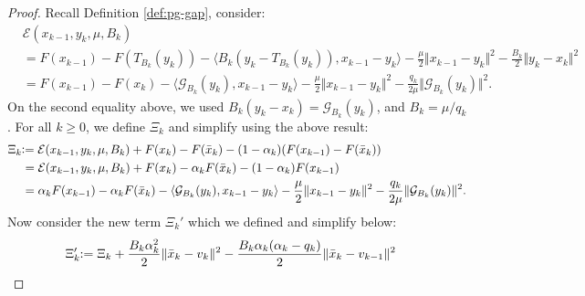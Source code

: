 \documentclass[12pt]{article}
\begin{document}
        \begin{proof}
            Recall Definition \ref{def:pg-gap}, consider: 
            \begin{align*}
                &\mathcal E(x_{k - 1}, y_k, \mu, B_k) 
                \\
                &=
                F(x_{k - 1}) - F(T_{B_k}(y_k))
                - \langle 
                    B_k(y_k - T_{B_k}(y_k)),
                    x_{k - 1} - y_k
                \rangle
                - \frac{\mu}{2}\Vert x_{k - 1} - y_k\Vert^2
                - \frac{B_k}{2}\Vert y_k - x_k\Vert^2
                \\
                &= 
                F(x_{k - 1}) - F(x_k)
                - \langle 
                    \mathcal G_{B_k}(y_k), 
                    x_{k - 1} - y_k
                \rangle
                - \frac{\mu}{2}\Vert x_{k - 1} - y_k\Vert^2
                - \frac{q_k}{2\mu}\Vert \mathcal G_{B_k}(y_k)\Vert^2. 
            \end{align*}
            On the second equality above, we used $B_k(y_k - x_k)= \mathcal G_{B_k}(y_k)$, and $B_k = \mu/q_k$.
            For all $k \ge 0$, we define $\Xi_k$ and simplify using the above result: 
            \begin{align*}
                \Xi_k &\hspace{-0.3em}\vcentcolon= 
                \mathcal E(x_{k - 1}, y_k, \mu, B_k)
                + F(x_k) - F(\bar x_k)
                - (1 - \alpha_k)(F(x_{k - 1}) - F(\bar x_k))
                \\
                &= 
                \mathcal E(x_{k - 1}, y_k, \mu, B_k)
                + F(x_k) - \alpha_kF(\bar x_k) - (1 - \alpha_k)F(x_{k - 1})
                \\
                &=
                \alpha_kF(x_{k - 1}) - \alpha_k F(\bar x_k)
                - \langle \mathcal G_{B_k}(y_k), x_{k - 1} - y_k\rangle
                - \frac{\mu}{2}\Vert x_{k - 1} - y_k\Vert^2 
                - \frac{q_k}{2\mu}\Vert \mathcal G_{B_k}(y_k)\Vert^2. 
            \end{align*}
            Now consider the new term $\Xi_k'$ which we defined and simplify below: 
            {\allowdisplaybreaks
            \begin{align*}
                \Xi_k'
                &\hspace{-0.3em}:=
                \Xi_k + \frac{B_k\alpha_k^2}{2}\Vert \bar x_k - v_k\Vert^2 
                - \frac{B_k\alpha_k(\alpha_k - q_k)}{2}\Vert \bar x_k - v_{k - 1}\Vert^2

\end{align*}}
\end{proof}
\end{document}
